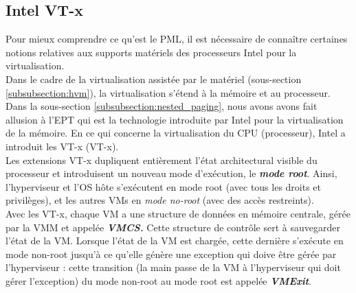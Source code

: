 \subsection{Intel VT-x}
\label{subsubsection:intel_vtx}
Pour mieux comprendre ce qu'est le PML, il est nécessaire de connaître certaines notions relatives aux supports matériels des processeurs Intel pour la virtualisation.\\
Dans le cadre de la virtualisation assistée par le matériel (sous-section \ref{subsubsection:hvm}), la virtualisation s'étend à la mémoire et au processeur.  Dans la sous-section \ref{subsubsection:nested_paging}, nous avons avons fait allusion à l'EPT qui est la technologie introduite par Intel pour la virtualisation de la mémoire. En ce qui concerne la virtualisation du CPU (processeur), Intel a introduit les \acs{VT-x} (\acl{VT-x}).\\
Les extensions \acs{VT-x} dupliquent entièrement l'état architectural visible du processeur et introduisent un nouveau mode d'exécution, le \textbf{\textit{mode root}}. Ainsi, l'hyperviseur et l'\acs{OS} hôte s'exécutent en mode root (avec tous les droits et privilèges), et les autres VMs en \textit{mode no-root} (avec des accès restreints).\\
Avec les VT-x, chaque VM a une structure de données en mémoire centrale, gérée par la \acs{VMM} et appelée \textit{\textbf{\ac{VMCS}.}} Cette structure de contrôle sert à sauvegarder l'état de la VM. Lorsque l'état de la VM est chargée, cette dernière s'exécute en mode non-root jusqu'à ce qu'elle génère une exception qui doive être gérée par l'hyperviseur : cette transition (la main passe de la VM à l'hyperviseur qui doit gérer l'exception) du mode non-root au mode root est appelée \textit{\textbf{VMExit}}.

